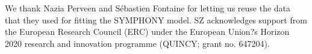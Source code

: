 \documentclass[soil]{copernicus}
\begin{document}
\begin{acknowledgements}
We thank Nazia Perveen and S\'{e}bastien Fontaine for letting us reuse the data
that they used for fitting the SYMPHONY model. SZ acknowledges support from the
European Research Council (ERC) under the European Union?s Horizon 2020 research
and innovation programme (QUINCY; grant no. 647204).
\end{acknowledgements} 




 

%
%
 


\end{document}

